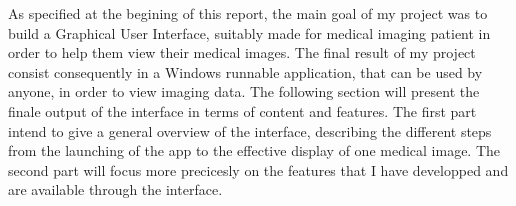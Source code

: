 As specified at the begining of this report, the main goal of my project was to build a Graphical User Interface, suitably made for medical imaging patient in order to help them view their medical images. The final result of my project consist consequently in a Windows runnable application, that can be used by anyone, in order to view imaging data. The following section will present the finale output of the interface in terms of content and features. The first part intend to give a general overview of the interface, describing the different steps from the launching of the app to the effective display of one medical image. The second part will focus more precicesly on the features that I have developped and are available through the interface.